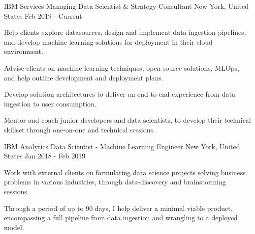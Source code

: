

\begin{cventries}

  \cventry
    {IBM Services}
    {Managing Data Scientist \& Strategy Consultant} %
    {New York, United States} %
    {Feb 2019 - Current} %
    {
      \begin{cvitems} %
        \item {Help clients explore datasources, design and implement data ingestion pipelines, and develop machine learning solutions for deployment in their cloud environment.}
        \item {Advise clients on machine learning techniques, open source solutions, MLOps, and help outline development and deployment plans.}
        \item {Develop solution architectures to deliver an end-to-end experience from data ingestion to user consumption.}
        \item {Mentor and coach junior developers and data scientists, to develop their technical skillset through one-on-one and technical sessions.}
      \end{cvitems}
    }

  \cventry
    {IBM Analytics} %
    {Data Scientist - Machine Learning Engineer} %
    {New York, United States} %
    {Jan 2018 - Feb 2019} %
    {
      \begin{cvitems} %
        \item {Work with external clients on formulating data science projects solving business problems in various industries, through data-discovery and brainstorming sessions.}
        \item {Through a period of up to 90 days, I help deliver a minimal viable product, encompassing a full pipeline from data ingestion and wrangling to a deployed model.}
      \end{cvitems}
    }


\end{cventries}
